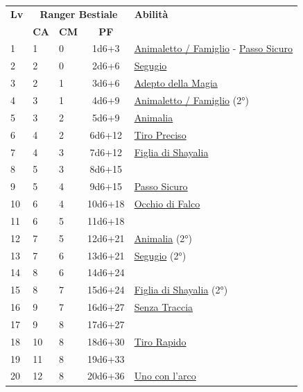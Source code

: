 {\begin{multicols}{2}


\noindent\begin{tabularx}{\linewidth}{p{0.3cm}|p{0.3cm}p{0.3cm}c|X|}
	\toprule
 \rowcolor{gray!20}	\textbf{Lv} & \multicolumn{3}{c|}{\textbf{Ranger Bestiale}} & \textbf{Abilità} \\
& \centering\arraybackslash \textbf{CA} & \centering\arraybackslash \textbf{CM} & \centering\arraybackslash \textbf{PF} & \\
	\toprule
	1 &1	& 0	&	1d6+3	&\hyperlink{Animaletto / Famiglio}{Animaletto / Famiglio} - \hyperlink{Passo Sicuro}{Passo Sicuro}\\
 \rowcolor{gray!20}2	&	2	& 0	&	2d6+6	&\hyperlink{Segugio}{Segugio}\\
	3	&	2	& 1	&	3d6+6	&\hyperlink{Adepto della Magia}{Adepto della Magia}\\
 \rowcolor{gray!20}4	&	3	& 1	&	4d6+9	&\hyperlink{Animaletto / Famiglio}{Animaletto / Famiglio} (2°)\\
	5	&	3	& 2	&	5d6+9	&\hyperlink{Animalia}{Animalia}\\
 \rowcolor{gray!20}6	&	4	& 2	&	6d6+12	&\hyperlink{Tiro Preciso}{Tiro Preciso}\\
	7	&	4	& 3	&	7d6+12	&\hyperlink{Figlia di Shayalia}{Figlia di Shayalia}\\
 \rowcolor{gray!20}8	&	5	& 3	&	8d6+15	&\\
	9	&	5	& 4	&	9d6+15	&\hyperlink{Passo Sicuro}{Passo Sicuro}\\
 \rowcolor{gray!20}10	&	6	& 4	&	10d6+18	&\hyperlink{Occhio di Falco}{Occhio di Falco}\\
	11	&	6	& 5	&	11d6+18	&\\
 \rowcolor{gray!20}12	&	7	& 5	&	12d6+21	&\hyperlink{Animalia}{Animalia} (2°)\\
	13	&	7	& 6	&	13d6+21	&\hyperlink{Segugio}{Segugio} (2°)\\
 \rowcolor{gray!20}14	&	8	& 6	&	14d6+24	&\\
	15	&	8	& 7	&	15d6+24	&\hyperlink{Figlia di Shayalia}{Figlia di Shayalia} (2°)\\
 \rowcolor{gray!20}16	&	9	& 7	&	16d6+27	&\hyperlink{Senza Traccia}{Senza Traccia}\\
	17	&	9	& 8	&	17d6+27	&\\
 \rowcolor{gray!20}18	&	10	& 8	&	18d6+30	&\hyperlink{Tiro Rapido}{Tiro Rapido}\\
	19	&	11	& 8	&	19d6+33	&\\
 \rowcolor{gray!20}20	&	12	& 8	&	20d6+36	&\hyperlink{Uno con l'arco}{Uno con l'arco}\\
\end{tabularx}


\end{multicols}}
